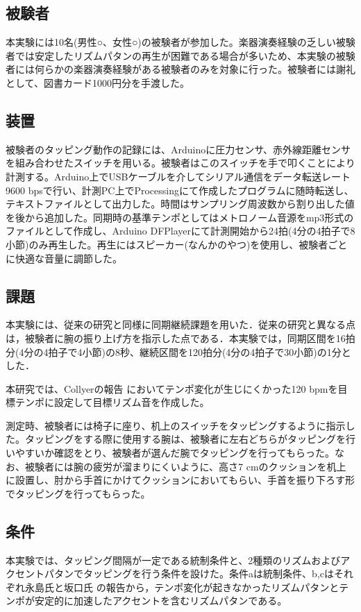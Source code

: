 \documentclass[twocolumn,10pt]{jarticle}
\begin{document}
\subsection{被験者}
本実験には10名(男性○、女性○)の被験者が参加した。楽器演奏経験の乏しい被験者では安定したリズムパタンの再生が困難である場合が多いため、本実験の被験者には何らかの楽器演奏経験がある被験者のみを対象に行った。被験者には謝礼として、図書カード1000円分を手渡した。

\subsection{装置}
被験者のタッピング動作の記録には、Arduinoに圧力センサ、赤外線距離センサを組み合わせたスイッチを用いる。被験者はこのスイッチを手で叩くことにより計測する。Arduino上でUSBケーブルを介してシリアル通信をデータ転送レート9600 bpsで行い、計測PC上でProcessingにて作成したプログラムに随時転送し、テキストファイルとして出力した。時間はサンプリング周波数から割り出した値を後から追加した。同期時の基準テンポとしてはメトロノーム音源をmp3形式のファイルとして作成し、Arduino DFPlayerにて計測開始から24拍(4分の4拍子で8小節)のみ再生した。再生にはスピーカー(なんかのやつ)を使用し、被験者ごとに快適な音量に調節した。

\subsection{課題}
本実験には、従来の研究と同様に同期継続課題を用いた．従来の研究と異なる点は，被験者に腕の振り上げ方を指示した点である．本実験では，同期区間を16拍分(4分の4拍子で4小節)の8秒、継続区間を120拍分(4分の4拍子で30小節)の1分とした．

本研究では、Collyerの報告 \cite{Collyer}においてテンポ変化が生じにくかった120 bpmを目標テンポに設定して目標リズム音を作成した。

測定時、被験者には椅子に座り、机上のスイッチをタッピングするように指示した。タッピングをする際に使用する腕は、被験者に左右どちらがタッピングを行いやすいか確認をとり、被験者が選んだ腕でタッピングを行ってもらった。なお、被験者には腕の疲労が溜まりにくいように、高さ7 cmのクッションを机上に設置し、肘から手首にかけてクッションにおいてもらい、手首を振り下ろす形でタッピングを行ってもらった。

\subsection{条件}
本実験では、タッピング間隔が一定である統制条件と、2種類のリズムおよびアクセントパタンでタッピングを行う条件を設けた。条件aは統制条件、b,cはそれぞれ永島氏と坂口氏 \cite{Nagasima}の報告から，テンポ変化が起きなかったリズムパタンとテンポが安定的に加速したアクセントを含むリズムパタンである。
\end{document}
